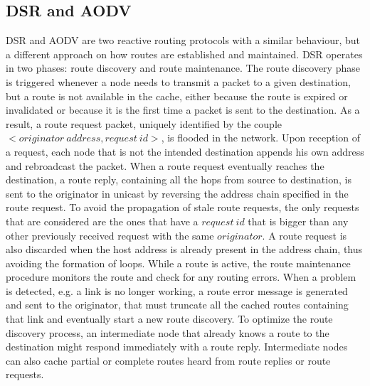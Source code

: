 \subsection{DSR and AODV}

\gls{DSR} and \gls{AODV} are two reactive routing protocols with a similar behaviour, but a different approach on how routes are established and maintained.
\gls{DSR} operates in two phases: route discovery and route maintenance. The route discovery phase is triggered whenever a node needs to transmit a packet to a given destination, but a route is not available in the cache, either because the route is expired or invalidated or because it is the first time a packet is sent to the destination. As a result, a route request packet, uniquely identified by the couple $<originator \ address, request \ id>$, is flooded in the network. Upon reception of a request, each node that is not the intended destination appends his own address and rebroadcast the packet. When a route request eventually reaches the destination, a route reply, containing all the hops from source to destination, is sent to the originator in unicast by reversing the address chain specified in the route request. To avoid the propagation of stale route requests, the only requests that are considered are the ones that have a $request \ id$ that is bigger than any other previously received request with the same $originator$. A route request is also discarded when the host address is already present in the address chain, thus avoiding the formation of loops. While a route is active, the route maintenance procedure monitors the route and check for any routing errors. When a problem is detected, e.g. a link is no longer working, a route error message is generated and sent to the originator, that must truncate all the cached routes containing that link and eventually start a new route discovery. To optimize the route discovery process, an intermediate node that already knows a route to the destination might respond immediately with a route reply. Intermediate nodes can also cache partial or complete routes heard from route replies or route requests. \\ \\
